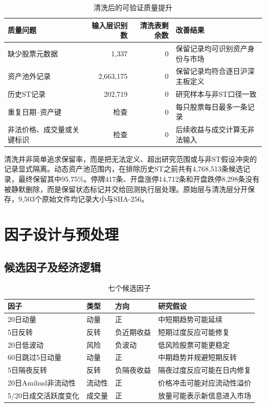 \documentclass[10.5pt,a4paper]{ctexart}
\begin{document}
\begin{table}[H]\centering\small
\caption{清洗后的可验证质量提升}
\begin{tabular}{lrrl}
\toprule 质量问题 & 输入层识别数 & 清洗表剩余数 & 改善结果\\\midrule
缺少股票元数据 & 1,337 & 0 & 保留记录均可识别资产身份与市场\\
资产池外记录 & 2,663,175 & 0 & 保留记录均符合逐日沪深主板定义\\
历史ST记录 & 202,719 & 0 & 研究样本与非ST口径一致\\
重复日期--资产键 & 检查 & 0 & 每只股票每日最多一条记录\\
非法价格、成交量或关键标识 & 检查 & 0 & 后续收益与成交计算无非法输入\\\bottomrule
\end{tabular}
\end{table}

清洗并非简单追求保留率，而是把无法定义、超出研究范围或与非ST假设冲突的记录显式隔离。动态资产池范围内，在排除历史ST之前共有4,768,513条候选记录，最终保留其中95.75\%。停牌417条、开盘涨停14,712条和开盘跌停8,298条没有被静默删除，而是保留状态标记并交给回测执行层处理。原始层与清洗层分开保存，9,503个原始文件均记录大小与SHA-256。

\section{因子设计与预处理}
\subsection{候选因子及经济逻辑}
\begin{table}[H]\centering\small
\caption{七个候选因子}
\begin{tabularx}{\textwidth}{lllX}
\toprule 因子 & 类型 & 方向 & 研究假设\\\midrule
20日动量 & 动量 & 正 & 中短期趋势可能延续\\
5日反转 & 反转 & 负近期收益 & 短期过度反应可能修复\\
20日低波动 & 风险 & 负波动 & 低风险股票可能更稳定\\
60日跳过5日动量 & 动量 & 正 & 中期趋势并规避短期反转\\
5日隔夜反转 & 反转 & 负隔夜收益 & 隔夜过度反应可能在日内修复\\
20日Amihud非流动性 & 流动性 & 正 & 价格冲击可能对应流动性溢价\\
5/20日成交活跃度变化 & 成交量 & 正 & 放量可能表示新信息进入市场\\
\bottomrule
\end{tabularx}
\end{table}
\end{document}
